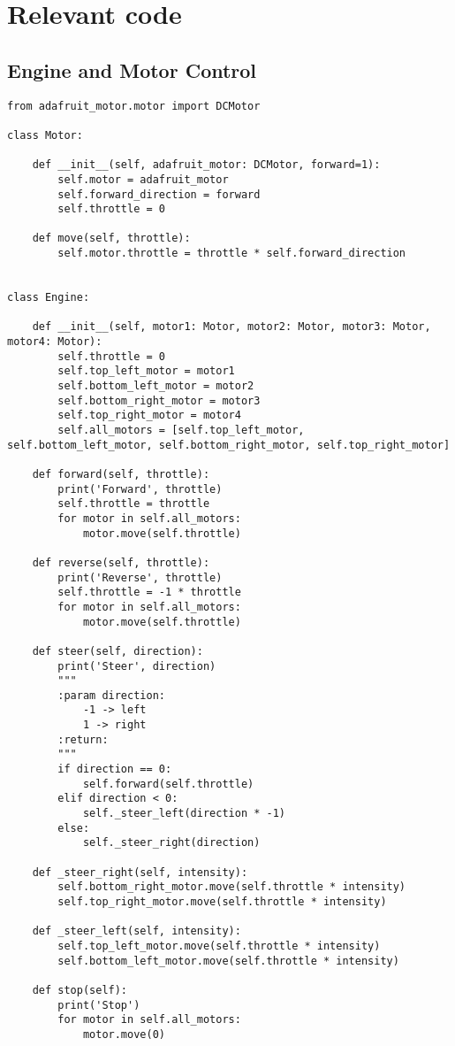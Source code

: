 \appendix
\chapter{Relevant code}
\label{ch:relevant-code}

\section{Engine and Motor Control}
\label{sec:annex-engine-motor-control}
\begin{verbatim}
from adafruit_motor.motor import DCMotor

class Motor:

    def __init__(self, adafruit_motor: DCMotor, forward=1):
        self.motor = adafruit_motor
        self.forward_direction = forward
        self.throttle = 0

    def move(self, throttle):
        self.motor.throttle = throttle * self.forward_direction


class Engine:

    def __init__(self, motor1: Motor, motor2: Motor, motor3: Motor, motor4: Motor):
        self.throttle = 0
        self.top_left_motor = motor1
        self.bottom_left_motor = motor2
        self.bottom_right_motor = motor3
        self.top_right_motor = motor4
        self.all_motors = [self.top_left_motor, self.bottom_left_motor, self.bottom_right_motor, self.top_right_motor]

    def forward(self, throttle):
        print('Forward', throttle)
        self.throttle = throttle
        for motor in self.all_motors:
            motor.move(self.throttle)

    def reverse(self, throttle):
        print('Reverse', throttle)
        self.throttle = -1 * throttle
        for motor in self.all_motors:
            motor.move(self.throttle)

    def steer(self, direction):
        print('Steer', direction)
        """
        :param direction:
            -1 -> left
            1 -> right
        :return:
        """
        if direction == 0:
            self.forward(self.throttle)
        elif direction < 0:
            self._steer_left(direction * -1)
        else:
            self._steer_right(direction)

    def _steer_right(self, intensity):
        self.bottom_right_motor.move(self.throttle * intensity)
        self.top_right_motor.move(self.throttle * intensity)

    def _steer_left(self, intensity):
        self.top_left_motor.move(self.throttle * intensity)
        self.bottom_left_motor.move(self.throttle * intensity)

    def stop(self):
        print('Stop')
        for motor in self.all_motors:
            motor.move(0)

\end{verbatim}
